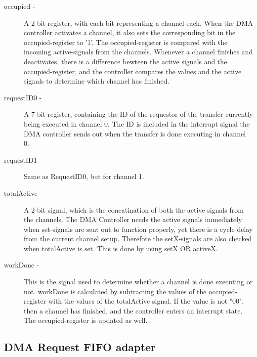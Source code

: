 \begin{appendix}
\begin{description}
    \item[occupied -]
    A 2-bit register, with each bit representing a channel each.
    When the DMA controller activates a channel, it also sets the corresponding bit in the occupied-register to '1'.
    The occupied-register is compared with the incoming active-signals from the channels.
    Whenever a channel finishes and deactivates, there is a difference bewteen the active signals and the occupied-register, and the controller compares the values and the active signals to determine which channel has finished.
    \item[requestID0 -]
    A 7-bit register, containing the ID of the requestor of the transfer currently being executed in channel 0.
    The ID is included in the interrupt signal the DMA controller sends out when the transfer is done executing in channel 0.
    \item[requestID1 -]
    Same as RequestID0, but for channel 1.
    \item[totalActive -]
    A 2-bit signal, which is the concatination of both the active signals from the channels.
    The DMA Controller needs the active signals immediately when set-signals are sent out to function properly, yet there is a cycle delay from the current channel setup.
    Therefore the setX-signals are also checked when totalActive is set.
    This is done by using setX OR activeX.
    \item[workDone - ]
    This is the signal used to determine whether a channel is done executing or not.
    workDone is calculated by subtracting the values of the occupied-register with the values of the totalActive signal.
    If the value is not "00", then a channel has finished, and the controller enters an interrupt state.
    The occupied-register is updated as well.
\end{description}

\subsection{DMA Request FIFO adapter}


\end{appendix}
